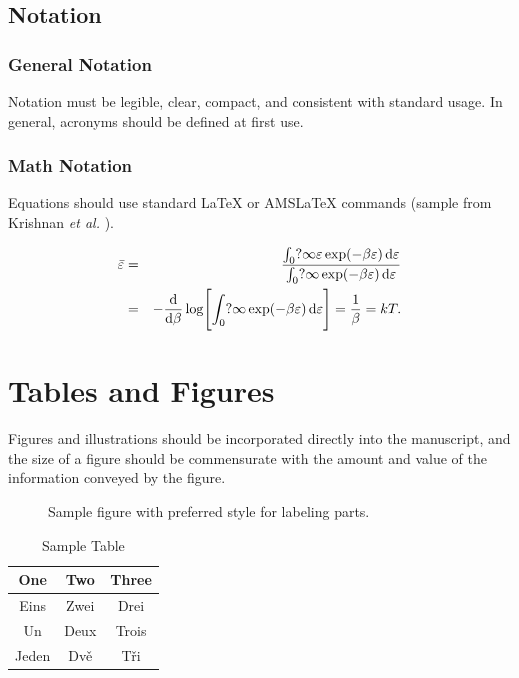 \documentclass[letterpaper,10pt]{article}
\begin{document}
\subsection{Notation}
\subsubsection{General Notation}
Notation must be
legible, clear, compact, and consistent with standard usage. In
general, acronyms should be defined at first use.


\subsubsection{Math Notation}
Equations should use standard \LaTeX{} or AMS\LaTeX{} commands (sample from Krishnan \textit{et al.} \cite{krishnan00}).

\begin{eqnarray}
\bar\varepsilon &=& \frac{\int_0?\infty\varepsilon
\exp(-\beta\varepsilon)\,{\rm d}\varepsilon}{\int_0?\infty
\exp(-\beta\varepsilon)\,{\rm d}\varepsilon}\nonumber\\
&=& -\frac{{\rm d}}{{\rm d}\beta}\log\Biggl[\int_0?\infty\exp
(-\beta\varepsilon)\,{\rm d}\varepsilon\Biggr]=\frac1\beta=kT.
\end{eqnarray}

\section{Tables and Figures}
Figures and illustrations should be incorporated directly into the
manuscript, and the size of a figure should be commensurate with the amount
and value of the information conveyed by the figure.

\begin{figure}[htbp]
  \centering
\caption{Sample figure with preferred style for labeling parts.}
\end{figure}


\begin{table}[htb]
 \centering \caption{Sample Table}
\begin{tabular}{ccc}
    \hline
    One & Two & Three \\
    \hline
    Eins & Zwei & Drei \\
    Un & Deux & Trois \\
    Jeden & Dv\v{e} & T\v{r}i \\
    \hline
   \end{tabular}
    \end{table}
\end{document}
